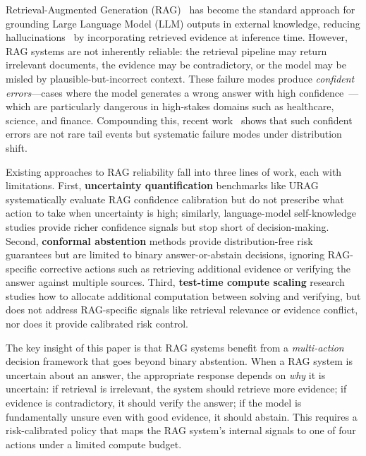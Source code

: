 \documentclass[letterpaper]{article}
\begin{document}
Retrieval-Augmented Generation (RAG)~\cite{lewis2020rag,gao2024retrieval} has become the standard approach for grounding Large Language Model (LLM) outputs in external knowledge, reducing hallucinations~\cite{ji2023survey,shuster2021retrieval} by incorporating retrieved evidence at inference time. However, RAG systems are not inherently reliable: the retrieval pipeline may return irrelevant documents, the evidence may be contradictory, or the model may be misled by plausible-but-incorrect context. These failure modes produce \emph{confident errors}---cases where the model generates a wrong answer with high confidence~\cite{kadavath2022language,mallen2023not}---which are particularly dangerous in high-stakes domains such as healthcare, science, and finance. Compounding this, recent work~\cite{schaeffer2024are} shows that such confident errors are not rare tail events but systematic failure modes under distribution shift.

Existing approaches to RAG reliability fall into three lines of work, each with limitations. First, \textbf{uncertainty quantification} benchmarks like URAG \cite{ye2025urag} systematically evaluate RAG confidence calibration but do not prescribe what action to take when uncertainty is high; similarly, language-model self-knowledge studies \cite{kadavath2022language,lin2022teaching,tian2023just,kuhn2023semantic} provide richer confidence signals but stop short of decision-making. Second, \textbf{conformal abstention} methods \cite{mohri2024conformal,quach2024conformal,sadinle2019least,romano2020classification} provide distribution-free risk guarantees \cite{vovk2005algorithmic,angelopoulos2023conformal} but are limited to binary answer-or-abstain decisions, ignoring RAG-specific corrective actions such as retrieving additional evidence or verifying the answer against multiple sources. Third, \textbf{test-time compute scaling} research \cite{snell2024solve,lightman2023let} studies how to allocate additional computation between solving and verifying, but does not address RAG-specific signals like retrieval relevance or evidence conflict, nor does it provide calibrated risk control.

The key insight of this paper is that RAG systems benefit from a \emph{multi-action} decision framework that goes beyond binary abstention. When a RAG system is uncertain about an answer, the appropriate response depends on \emph{why} it is uncertain: if retrieval is irrelevant, the system should retrieve more evidence; if evidence is contradictory, it should verify the answer; if the model is fundamentally unsure even with good evidence, it should abstain. This requires a risk-calibrated policy that maps the RAG system's internal signals to one of four actions under a limited compute budget.
\end{document}
